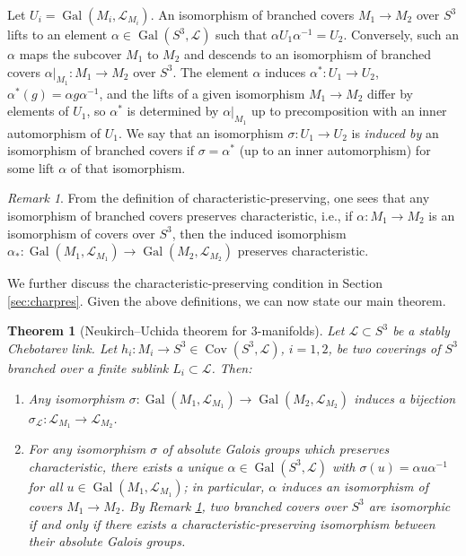 \documentclass{amsart}
\theoremstyle{plain}
\theoremstyle{definition}
\theoremstyle{plain}
\theoremstyle{plain}
\theoremstyle{plain}
\theoremstyle{remark}
\newtheorem{remark}[theorem]{Remark}
\theoremstyle{remark}
\theoremstyle{plain}
\theoremstyle{definition}
\theoremstyle{plain}
\DeclareMathOperator{\Gal}{\mathrm{Gal}}
\DeclareMathOperator{\Cov}{\mathrm{Cov}}
\newcounter{main}
\theoremstyle{plain}
\newtheorem{mainthm}[main]{\textbf{Theorem}}
\theoremstyle{plain}
\numberwithin{equation}{section}
\begin{document}
Let $U_i = \Gal(M_i, \mathcal L_{M_i})$. An isomorphism of branched covers $M_1 \to M_2$ over $S^3$ lifts to an element $\alpha \in \Gal(S^3, \mathcal L)$ such that $\alpha U_1\alpha^{-1} = U_2$. Conversely, such an $\alpha$ maps the subcover $M_1$ to $M_2$ and descends to an isomorphism of branched covers $\alpha|_{M_1}: M_1 \to M_2$ over $S^3$. The element $\alpha$ induces $\alpha^*: U_1 \to U_2$, $\alpha^*(g) = \alpha g \alpha^{-1}$, and the lifts of a given isomorphism $M_1 \to M_2$ differ by elements of $U_1$, so $\alpha^*$ is determined by $\alpha|_{M_1}$ up to precomposition with an inner automorphism of $U_1$. We say that an isomorphism $\sigma: U_1 \to U_2$ is \emph{induced by} an isomorphism of branched covers if $\sigma = \alpha^*$ (up to an inner automorphism) for some lift $\alpha$ of that isomorphism.

\begin{remark}\label{rem:inducedIsom}
From the definition of characteristic-preserving, one sees that any isomorphism of branched covers preserves characteristic, i.e., if $\alpha: M_1 \to M_2$ is an isomorphism of covers over $S^3$, then the induced isomorphism $\alpha_*: \Gal(M_1, \mathcal{L}_{M_1}) \to \Gal(M_2, \mathcal{L}_{M_2})$ preserves characteristic.
\end{remark}

We further discuss the characteristic-preserving condition in Section \ref{sec:charpres}. Given the above definitions, we can now state our main theorem. 

\begin{mainthm}[Neukirch--Uchida theorem for 3-manifolds]\label{thm:main}
Let $\mathcal{L} \subset S^3$ be a stably Chebotarev link. Let $h_i: M_i \to S^3 \in \Cov(S^3, \mathcal{L})$, $i = 1, 2$, be two coverings of $S^3$ branched over a finite sublink $L_i \subset \mathcal{L}$. Then:
\begin{enumerate}
    \item Any isomorphism $\sigma: \Gal(M_1, \mathcal{L}_{M_1}) \to \Gal(M_2, \mathcal{L}_{M_2})$ induces a bijection $\sigma_{\mathcal L}: \mathcal{L}_{M_1} \rightarrow \mathcal{L}_{M_2}$.
    \item For any isomorphism $\sigma$ of absolute Galois groups which preserves characteristic, there exists a unique $\alpha\in\Gal(S^3,\mathcal{L})$ with $\sigma(u) = \alpha u \alpha^{-1}$ for all $u \in \Gal(M_1, \mathcal L_{M_1})$; in particular, $\alpha$ induces an isomorphism of covers $M_1 \to M_2$. By Remark \ref{rem:inducedIsom}, two branched covers over $S^3$ are isomorphic if and only if there exists a characteristic-preserving isomorphism between their absolute Galois groups. 
\end{enumerate} 
\end{mainthm}
\end{document}
